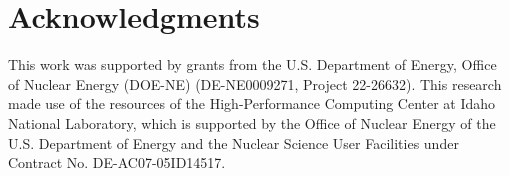 \documentclass[preprint,12pt]{elsarticle}
\begin{document}
\section{Acknowledgments}

This work was supported by grants from the U.S. Department of Energy, Office of Nuclear Energy (DOE-NE) (DE-NE0009271, Project 22-26632). This research made use of the resources of the High-Performance Computing Center at Idaho National Laboratory, which is supported by the Office of Nuclear Energy of the U.S. Department of Energy and the Nuclear Science User Facilities under Contract No. DE-AC07-05ID14517.



\FloatBarrier
 

\end{document}
